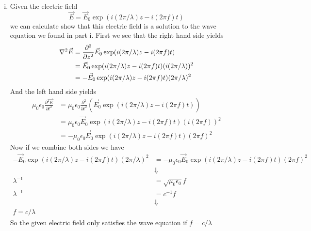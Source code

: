 \documentclass[11pt]{article}
\numberwithin{equation}{section}
\begin{document}
\begin{enumerate}[(i)]
\item
Given the electric field
$$\vec{E} = \vec{E}_0\exp(i(2\pi/\lambda)z-i(2\pi f)t)$$
we can calculate show that this electric field is a solution to the wave equation we found in part i. First we see that the right hand side yields
\begin{align*}
\bold\nabla^2\vec{E} &= \frac{\partial^2}{\partial z^2}\vec{E}_0\exp(i(2\pi/\lambda)z-i(2\pi f)t)\\
&= \vec{E}_0\exp(i(2\pi/\lambda)z-i(2\pi f)t)(i(2\pi/\lambda))^2\\
&= -\vec{E}_0\exp(i(2\pi/\lambda)z-i(2\pi f)t)(2\pi/\lambda)^2
\end{align*}
And the left hand side yields
\begin{align*}
\mu_0\epsilon_0\frac{\partial^2\vec{E}}{\partial t^2} &= \mu_0\epsilon_0\frac{\partial^2}{\partial t^2}(\vec{E}_0\exp(i(2\pi/\lambda)z-i(2\pi f)t))\\
&= \mu_0\epsilon_0\vec{E}_0\exp(i(2\pi/\lambda)z-i(2\pi f)t)(i(2\pi f))^2\\
&= -\mu_0\epsilon_0\vec{E}_0\exp(i(2\pi/\lambda)z-i(2\pi f)t)(2\pi f)^2
\end{align*}
Now if we combine both sides we have
\begin{align*}
-\vec{E}_0\exp(i(2\pi/\lambda)z-i(2\pi f)t)(2\pi/\lambda)^2 &= -\mu_0\epsilon_0\vec{E}_0\exp(i(2\pi/\lambda)z-i(2\pi f)t)(2\pi f)^2 \\
&\Downarrow\\
\lambda^{-1} &= \sqrt{\mu_0\epsilon_0} f \\
\lambda^{-1} &=  c^{-1}f \\
&\Downarrow\\
f = c/\lambda
\end{align*}
So the given electric field only satisfies the wave equation if $f = c/\lambda$
\end{enumerate}
\end{document}
